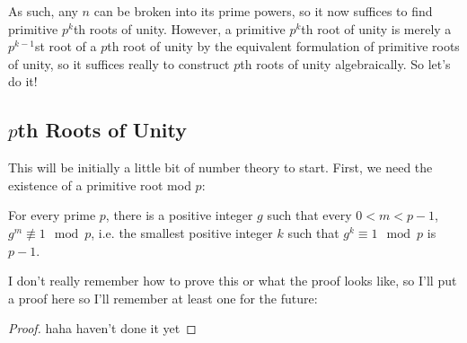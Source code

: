 \documentclass[12pt]{scrartcl}
\begin{document}
As such, any $n$ can be broken into its prime powers, so it now suffices to find primitive $p^k$th roots of unity. However, a primitive $p^k$th root of unity is merely a $p^{k-1}$st root of a $p$th root of unity by the equivalent formulation of primitive roots of unity, so it suffices really to construct $p$th roots of unity algebraically. So let's do it!  

\subsection{$p$th Roots of Unity}
This will be initially a little bit of number theory to start. First, we need the existence of a primitive root mod $p$: 
\begin{lemma}
For every prime $p$, there is a positive integer $g$ such that every $0 < m < p-1$, $g^m \not\equiv 1 \mod p$, i.e. the smallest positive integer $k$ such that $g^k \equiv 1 \mod p$ is $p-1$. 
\end{lemma}
I don't really remember how to prove this or what the proof looks like, so I'll put a proof here so I'll remember at least one for the future: 
\begin{proof}
haha haven't done it yet
\end{proof}
\end{document}
